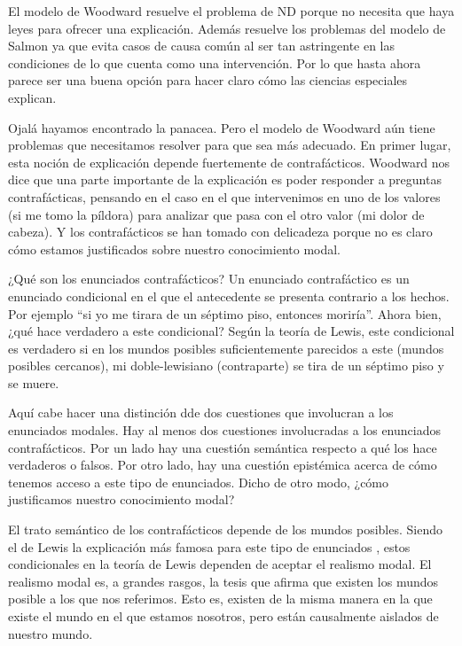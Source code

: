 El modelo de Woodward resuelve el problema de ND porque no necesita que haya leyes para ofrecer una explicación. Además resuelve los problemas del modelo de Salmon ya que evita casos de causa común al ser tan astringente en las condiciones de lo que cuenta como una intervención. Por lo que hasta ahora parece ser una buena opción para hacer claro cómo las ciencias especiales explican.

Ojalá hayamos encontrado la panacea. Pero el modelo de Woodward aún tiene problemas que necesitamos resolver para que sea más adecuado. En primer lugar, esta noción de explicación depende fuertemente de contrafácticos. Woodward nos dice que una parte importante de la explicación es poder responder a preguntas contrafácticas, pensando en el caso en el que intervenimos en uno de los valores (si me tomo la píldora) para analizar que pasa con el otro valor (mi dolor de cabeza). Y los contrafácticos se han tomado con delicadeza porque no es claro cómo estamos justificados sobre nuestro conocimiento modal.

¿Qué son los enunciados contrafácticos? Un enunciado contrafáctico es un enunciado condicional en el que el antecedente se presenta contrario a los hechos. Por ejemplo ``si yo me tirara de un séptimo piso, entonces moriría''. Ahora bien, ¿qué hace verdadero a este condicional? Según la teoría de Lewis, este condicional es verdadero si en los mundos posibles suficientemente parecidos a este (mundos posibles cercanos), mi doble-lewisiano (contraparte) se tira de un séptimo piso y se muere.

Aquí cabe hacer una distinción dde dos cuestiones que involucran a los enunciados modales. Hay al menos dos cuestiones involucradas a los enunciados contrafácticos. Por un lado hay una cuestión semántica respecto a qué los hace verdaderos o falsos. Por otro lado, hay una cuestión epistémica acerca de cómo tenemos acceso a este tipo de enunciados. Dicho de otro modo, ¿cómo justificamos nuestro conocimiento modal?

El trato semántico de los contrafácticos depende de los mundos posibles. Siendo el de Lewis la explicación más famosa para este tipo de enunciados \citeyear{Lewis1973}, estos condicionales en la teoría de Lewis dependen de aceptar el realismo modal. El realismo modal es, a grandes rasgos, la tesis que afirma que existen los mundos posible a los que nos referimos. Esto es, existen de la misma manera en la que existe el mundo en el que estamos nosotros, pero están causalmente aislados de nuestro mundo.

